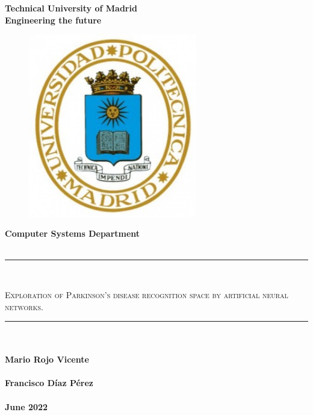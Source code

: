 \begin{titlepage}
	\begin{center}
		{\huge \textbf{Technical University of Madrid}}\\
		\vspace{5mm}
		{\large \textbf{Engineering the future}}\\
		\vspace{5mm}
		\begin{figure}[h]
			\centering
			\includegraphics[height = 8cm]{img/insigneaUPM.jpg}
		\end{figure}
		\vspace{5mm}
		{\LARGE \textbf{Computer Systems Department}}\\
		\vspace{5mm}
		{\large {}}\\
		\vspace{5mm}
		\textcolor{RoyalBlue}{\rule{\linewidth}{0.75mm}}\\
		\vspace{2mm}
		\begin{spacing}{1.5} %
			{\Large \textsc{Exploration of Parkinson's disease recognition space by artificial neural networks.}}
		\end{spacing}
		\textcolor{RoyalBlue}{\rule{\linewidth}{0.75mm}}\\
		\vspace{1cm}
		{\Large {}}\\
		\vspace{5mm}
		{\Large \textbf{Mario Rojo Vicente}}\\
		\vspace{5mm}
		{\Large {}}\\
		\vspace{5mm}
		{\Large \textbf{Francisco Díaz Pérez}}\\
		\vspace{5mm}
		{\Large {}}\\
		\vspace{5mm}
		{\Huge \textbf{June 2022}}
	\end{center}
\end{titlepage}